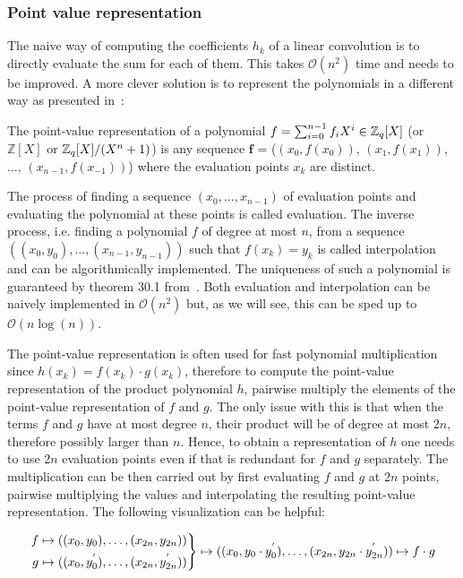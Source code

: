 \subsubsection{Point value representation}

The naive way of computing the coefficients $h_k$ of a linear convolution is to directly evaluate the sum for each of them. This takes $\mathcal{O}(n^2)$ time and needs to be improved. A more clever solution is to represent the polynomials in a different way as presented in~\parencite{10.5555/1614191}:

\begin{definition}
    The point-value representation of a polynomial $f = \sum_{i=0}^{n-1} f_i X^i \in \mathbb{Z}_q[X]$ (or $\mathbb{Z}[X]$ or $\mathbb{Z}_q[X]/(X^n + 1)$) is any sequence $\boldsymbol{f}$ = ($(x_0, f(x_0))$, $(x_1, f(x_1))$, $\ldots$, $(x_{n-1}, f(x_{-1}))$) where the evaluation points $x_k$ are distinct.
\end{definition}

The process of finding a sequence $(x_0, \ldots, x_{n-1})$ of evaluation points and evaluating the polynomial at these points is called evaluation. The inverse process, i.e. finding a polynomial $f$ of degree at most $n$, from a sequence $((x_0, y_0), \ldots, (x_{n-1}, y_{n-1}))$ such that $f(x_k) = y_k$ is called interpolation and can be algorithmically implemented. The uniqueness of such a polynomial is guaranteed by theorem 30.1 from~\parencite{10.5555/1614191}. Both evaluation and interpolation can be naively implemented in $\mathcal{O}(n^2)$ but, as we will see, this can be sped up to $\mathcal{O}(n \log(n))$.

The point-value representation is often used for fast polynomial multiplication since $h(x_k) = f(x_k) \cdot g(x_k)$, therefore to compute the point-value representation of the product polynomial $h$, pairwise multiply the elements of the point-value representation of $f$ and $g$. The only issue with this is that when the terms $f$ and $g$ have at most degree $n$, their product will be of degree at most $2n$, therefore possibly larger than $n$. Hence, to obtain a representation of $h$ one needs to use $2n$ evaluation points even if that is redundant for $f$ and $g$ separately. The multiplication can be then carried out by first evaluating $f$ and $g$ at $2n$ points, pairwise multiplying the values and interpolating the resulting point-value representation. The following visualization can be helpful:

\begin{equation*}
    \begin{rcases}
        \begin{aligned}
        f &\mapsto ((x_0, y_0), \ldots, (x_{2n}, y_{2n})) \\
        g &\mapsto ((x_0, y^{'}_0), \ldots, (x_{2n}, y^{'}_{2n}))
        \end{aligned}
    \end{rcases} \mapsto ((x_0, y_0 \cdot y^{'}_0), \ldots, (x_{2n}, y_{2n} \cdot y^{'}_{2n})) \mapsto f \cdot g 
\end{equation*}

